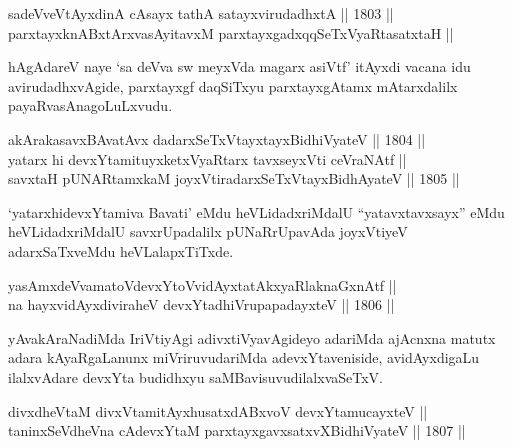 \begin{shl}
sadeVveVtAyxdinA cAsayx tathA satayxvirudadhxtA \hfill || 1803 ||  \\
parxtayxknABxtArxvasAyitavxM parxtayxgadxqqSeTxVyaRtasatxtaH ||
\end{shl}

\begin{artha}
hAgAdareV naye `sa deVva sw meyxVda magarx asiVtf' itAyxdi vacana idu avirudadhxvAgide, parxtayxgf
daqSiTxyu parxtayxgAtamx mAtarxdalilx payaRvasAnagoLuLxvudu.
\end{artha}

\begin{shl}
akArakasavxBAvatAvx \footnotemark[1]dadarxSeTxVtayxtayxBidhiVyateV \hfill || 1804 ||  \\
yatarx hi devxYtamituyxketxVyaRtarx tavxseyxVti ceVraNAtf || \\
savxtaH pUNARtamxkaM joyxVtiradarxSeTxVtayxBidhAyateV \hfill || 1805 ||  
\end{shl}

\begin{artha}
`yatarxhidevxYtamiva Bavati' eMdu heVLidadxriMdalU ``yatavxtavxsayx'' eMdu heVLidadxriMdalU
savxrUpadalilx pUNaRrUpavAda joyxVtiyeV adarxSaTxveMdu heVLalapxTiTxde.
\end{artha}


\begin{shl}
yasAmxdeVvamatoV\s devxYtoV\s vidAyxtatAkxyaRlaknaGxnAtf || \\
na hayxvidAyxdiviraheV devxYtadhiVrupapadayxteV \hfill || 1806 ||  
\end{shl}

\begin{artha}
yAvakAraNadiMda IriVtiyAgi adivxtiVyavAgideyo adariMda ajAcnxna matutx
adara kAyaRgaLanunx miVriruvudariMda adevxYtaveniside, avidAyxdigaLu
ilalxvAdare devxYta budidhxyu saMBavisuvudilalxvaSeTxV.
\end{artha}


\begin{shl}
divxdheVtaM divxVtamitAyxhusatxdABxvoV devxYtamucayxteV || \\
taninxSeVdheVna cAdevxYtaM parxtayxgavxsatxvXBidhiVyateV \hfill || 1807 ||  
\end{shl}

